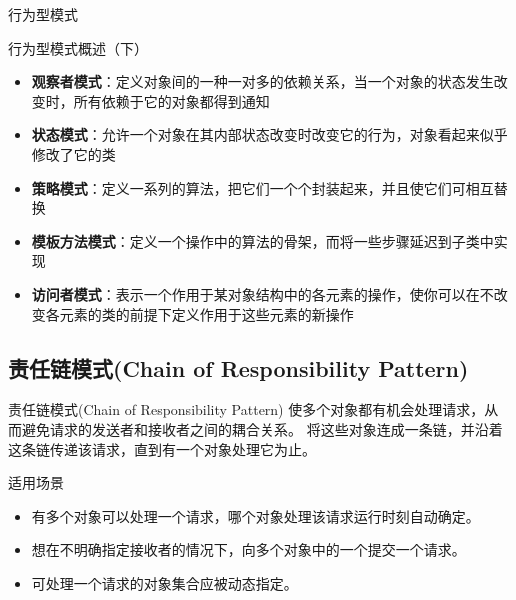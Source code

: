 \documentclass[UTF8,aspectratio=169]{beamer}
\begin{document}
\begin{frame}{行为型模式}
    \begin{ytublock}{行为型模式概述（下）}
        \begin{itemize}
            \item \textbf{观察者模式}：定义对象间的一种一对多的依赖关系，当一个对象的状态发生改变时，所有依赖于它的对象都得到通知
            \item \textbf{状态模式}：允许一个对象在其内部状态改变时改变它的行为，对象看起来似乎修改了它的类
            \item \textbf{策略模式}：定义一系列的算法，把它们一个个封装起来，并且使它们可相互替换
            \item \textbf{模板方法模式}：定义一个操作中的算法的骨架，而将一些步骤延迟到子类中实现
            \item \textbf{访问者模式}：表示一个作用于某对象结构中的各元素的操作，使你可以在不改变各元素的类的前提下定义作用于这些元素的新操作
        \end{itemize}
    \end{ytublock}
\end{frame}

\subsection{责任链模式(Chain of Responsibility Pattern)}

\begin{frame}{责任链模式(Chain of Responsibility Pattern)}
    使多个对象都有机会处理请求，从而避免请求的发送者和接收者之间的耦合关系。
    将这些对象连成一条链，并沿着这条链传递该请求，直到有一个对象处理它为止。
    \begin{ytublock}{适用场景}
        \begin{itemize}
            \item 有多个对象可以处理一个请求，哪个对象处理该请求运行时刻自动确定。
            \item 想在不明确指定接收者的情况下，向多个对象中的一个提交一个请求。
            \item 可处理一个请求的对象集合应被动态指定。
        \end{itemize}
    \end{ytublock}
\end{frame}
\end{document}
